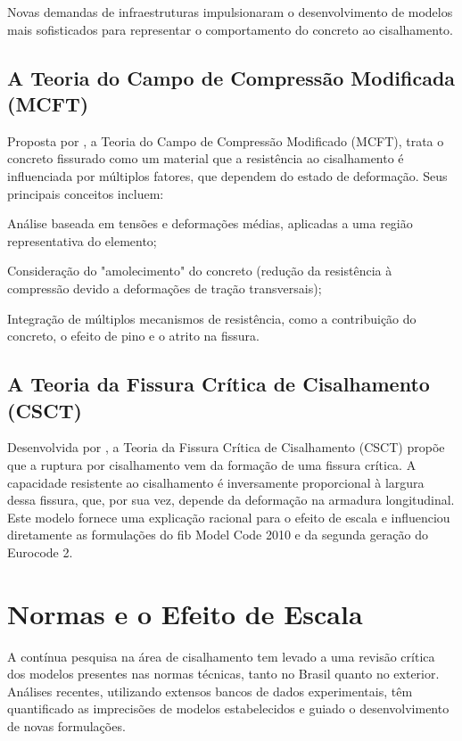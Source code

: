 Novas demandas de infraestruturas impulsionaram o desenvolvimento de modelos mais sofisticados para representar o comportamento do concreto ao cisalhamento. 

\subsection{A Teoria do Campo de Compressão Modificada (MCFT)}

Proposta por \textcite{Vecchio1986}, a Teoria do Campo de Compressão Modificado (MCFT), trata o concreto fissurado como um material que a resistência ao cisalhamento é influenciada por múltiplos fatores, que dependem do estado de deformação. Seus principais conceitos incluem:

\begin{alineas}
    \item Análise baseada em tensões e deformações médias, aplicadas a uma região representativa do elemento;
    \item Consideração do "amolecimento" do concreto (redução da resistência à compressão devido a deformações de tração transversais);
    \item  Integração de múltiplos mecanismos de resistência, como a contribuição do concreto, o efeito de pino e o atrito na fissura.
\end{alineas}

\subsection{A Teoria da Fissura Crítica de Cisalhamento (CSCT)}

Desenvolvida por \textcite{Muttoni2017}, a Teoria da Fissura Crítica de Cisalhamento (CSCT) propõe que a ruptura por cisalhamento vem da formação de uma fissura crítica. A capacidade resistente ao cisalhamento é inversamente proporcional à largura dessa fissura, que, por sua vez, depende da deformação na armadura longitudinal. Este modelo fornece uma explicação racional para o efeito de escala e influenciou diretamente as formulações do fib Model Code 2010 e da segunda geração do Eurocode 2.

\section{Normas e o Efeito de Escala}
A contínua pesquisa na área de cisalhamento tem levado a uma revisão crítica dos modelos presentes nas normas técnicas, tanto no Brasil quanto no exterior. Análises recentes, utilizando extensos bancos de dados experimentais, têm quantificado as imprecisões de modelos estabelecidos e guiado o desenvolvimento de novas formulações.

